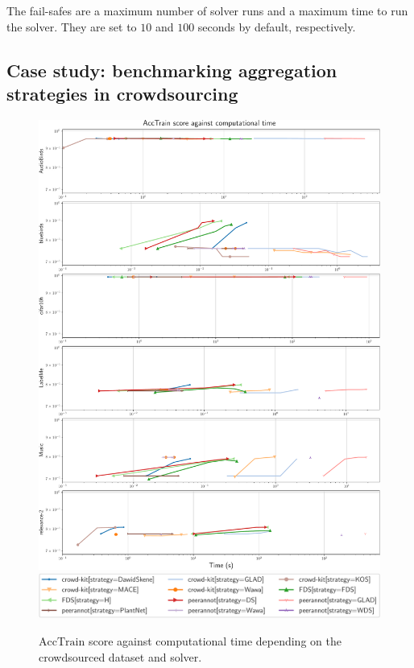 The fail-safes are a maximum number of solver runs and a maximum time to run the solver. They are set to $10$ and $100$ seconds by default, respectively.

\subsection{Case study: benchmarking aggregation strategies in crowdsourcing}

\begin{figure}[htbp]
    \centering
    \includegraphics[width=\textwidth]{./chapters/images_benchopt/thesis_fig.pdf}
    \includegraphics[width=\textwidth]{./chapters/images_benchopt/thesis_fig_legend.pdf}
    \caption{$\mathrm{AccTrain}$ score against computational time depending on the crowdsourced dataset and solver.}
    \label{fig:benchopt_crowd}
\end{figure}

